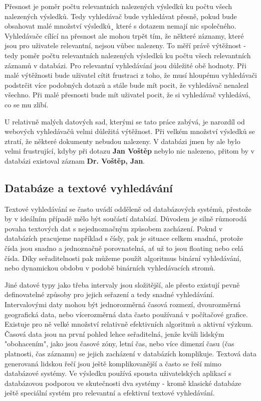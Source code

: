 \documentclass[11pt]{article}
\begin{document}
Přesnost je poměr počtu relevantních nalezených výsledků ku počtu všech
nalezených výsledků. Tedy vyhledávač bude vyhledávat přesně, pokud bude
obsahovat malé množství výsledků¸ které s dotazem nemají nic společného.
Vyhledávače cílící na přesnost ale mohou trpět tím, že některé záznamy, které
jsou pro uživatele relevantní, nejsou vůbec nalezeny. To měří právě výtěžnost -
tedy poměr počtu relevantních nalezených výsledků ku počtu všech relevantních
záznamů v databázi. Pro relevantní vyhledávání jsou důležité obě hodnoty. Při
malé výtěžnosti bude uživatel cítit frustraci z toho, že musí hloupému
vyhledávači podstrčit více podobných dotazů a stále bude mít pocit, že
vyhledávač nenalezl všechno. Při malé přesnosti bude mít uživatel pocit, že si
vyhledávač vyhledává, co se mu zlíbí.

U relativně malých datových sad, kterými se tato práce zabývá, je narozdíl od
webových vyhledávačů velmi důležitá výtěžnost. Při velkém množství výsledků se
ztratí, že některé dokumenty nebudou nalezeny. V databázi jmen by ale bylo
velmi frustrující, kdyby při dotazu \textbf{Jan Voštěp} nebylo nic nalezeno,
přitom by v databázi existoval záznam \textbf{Dr. Voštěp, Jan}.

\subsection{Databáze a textové vyhledávání}
Textové vyhledávání se často uvádí odděleně od databázových systémů, přestože
by v ideálním případě mělo být součástí databází. Důvodem je silně různorodá
povaha textových dat s nejednoznačným způsobem zacházení. Pokud v databázích
pracujeme například s čísly, pak je situace celkem snadná, protože čísla jsou
snadno a jednoznačně porovnatelná, ať už to jsou floating nebo celá čísla. Díky
seřaditelnosti pak můžeme použít algoritmus binární vyhledávání, nebo
dynamickou obdobu v podobě binárních vyhledávacích stromů.

Jiné datové typy jako třeba intervaly jsou složitější, ale přesto existují
pevně definovatelné způsoby pro jejich seřazení a tedy snadné vyhledávání.
Intervalovými daty mohou být jednorozměrná časová rozmezí, dvourozměrná
geografická data, nebo vícerozměrná data často používaná v počítačové grafice.
Existuje pro ně velké množství relativně efektivních algoritmů a aktivní
výzkum. Časová data jsou na první pohled lehce seřaditelná, jenže kvůli lidským
"obohacením", jako jsou časové zóny, letní čas, nebo více dimenzí času (čas
platnosti, čas záznamu) se jejich zacházení v databázích komplikuje. Textová
data generovaná lidskou řečí jsou ještě komplikovanější a často se řeší mimo
databázové systémy. Ve výsledku používá spousta uživatelských aplikací s
databázovou podporou ve skutečnosti dva systémy - kromě klasické databáze ještě
speciální systém pro relevantní a efektivní textové vyhledávání.
\end{document}
